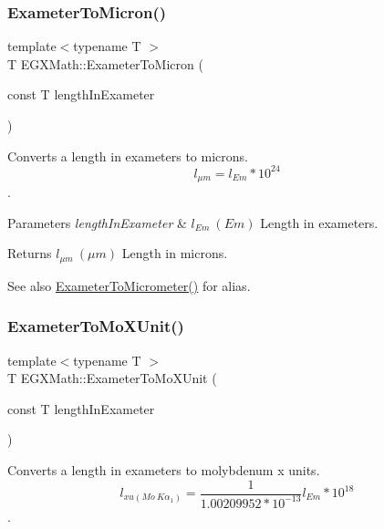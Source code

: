 \subsubsection{\texorpdfstring{Exameter\+To\+Micron()}{ExameterToMicron()}}
{\footnotesize\ttfamily template$<$typename T $>$ \\
T E\+G\+X\+Math\+::\+Exameter\+To\+Micron (\begin{DoxyParamCaption}\item[{const T}]{length\+In\+Exameter }\end{DoxyParamCaption})}



Converts a length in exameters to microns. \[ l_{\mu m}=l_{Em} * 10^{24} \]. 


\begin{DoxyParams}{Parameters}
{\em length\+In\+Exameter} & $ l_{Em}\ (Em)$ Length in exameters. \\
\hline
\end{DoxyParams}
\begin{DoxyReturn}{Returns}
$ l_{\mu m}\ (\mu m)$ Length in microns. 
\end{DoxyReturn}
\begin{DoxySeeAlso}{See also}
\mbox{\hyperlink{group___e_g_x_math-_conversions-_length_conversions-_s_i-_exameter-_s_i_gaee4a8b1fa77d023e7db7180e62646388}{Exameter\+To\+Micrometer()}} for alias. 
\end{DoxySeeAlso}
\mbox{\label{group___e_g_x_math-_conversions-_length_conversions-_s_i-_exameter-_non-_s_i_gadf73e46609660df6b7ae77ec7241183e}} 
\subsubsection{\texorpdfstring{Exameter\+To\+Mo\+X\+Unit()}{ExameterToMoXUnit()}}
{\footnotesize\ttfamily template$<$typename T $>$ \\
T E\+G\+X\+Math\+::\+Exameter\+To\+Mo\+X\+Unit (\begin{DoxyParamCaption}\item[{const T}]{length\+In\+Exameter }\end{DoxyParamCaption})}



Converts a length in exameters to molybdenum x units. \[ l_{xu(Mo\ K\alpha_1)}=\frac{1}{1.00209952*10^{-13}} l_{Em} * 10^{18}\]. 


